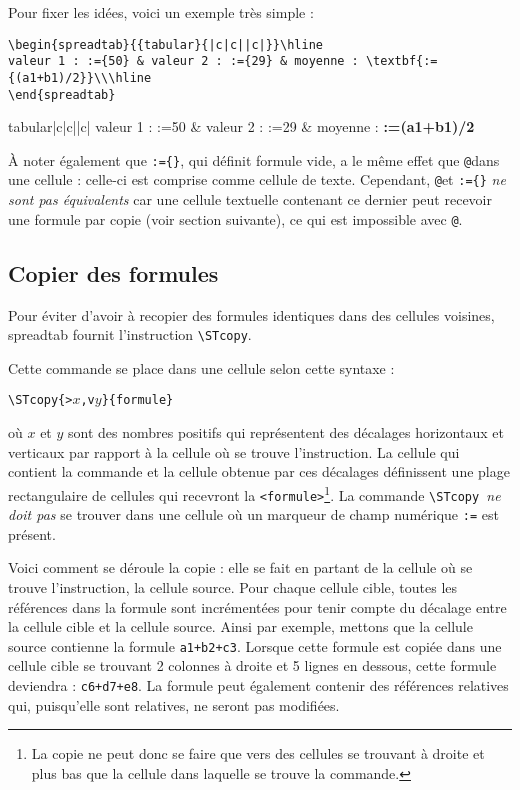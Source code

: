 \documentclass[a4paper,10pt]{article}
\newcommand\verbinline[1][]{\lstinline[breaklines=false,basicstyle=\normalsize\ttfamily,#1]}
\newcommand\ST{\textsf{spreadtab}\xspace}
\begin{document}
Pour fixer les idées, voici un exemple très simple :\par\nobreak
\begin{lstlisting}
\begin{spreadtab}{{tabular}{|c|c||c|}}\hline
valeur 1 : :={50} & valeur 2 : :={29} & moyenne : \textbf{:={(a1+b1)/2}}\\\hline
\end{spreadtab}
\end{lstlisting}
\begin{center}
\begin{spreadtab}{{tabular}{|c|c||c|}}\hline
valeur 1 : :={50} & valeur 2 : :={29} & moyenne : \textbf{:={(a1+b1)/2}}\\\hline
\end{spreadtab}
\end{center}
À noter également que \og\verb-:={}-\fg{}, qui définit formule vide, a le même effet que \og\verb-@-\fg dans une cellule : celle-ci est comprise comme cellule de texte. Cependant, \og\verb-@-\fg et \og\verb-:={}-\fg{} \emph{ne sont pas équivalents} car une cellule textuelle contenant ce dernier peut recevoir une formule par copie (voir section suivante), ce qui est impossible avec \og\verb-@-\fg.

\subsection{Copier des formules}
Pour éviter d'avoir à recopier des formules identiques dans des cellules voisines, \ST fournit l'instruction \verbinline-\STcopy-.

Cette commande se place dans une cellule selon cette syntaxe :
\begin{center}
\verbinline-\STcopy{>-$x$\verbinline-,v-$y$\verbinline-}{formule}-
\end{center}
où $x$ et $y$ sont des nombres positifs qui représentent des décalages horizontaux et verticaux par rapport à la cellule où se trouve l'instruction. La cellule qui contient la commande et la cellule obtenue par ces décalages définissent une plage rectangulaire de cellules qui recevront la \verb-<formule>-\footnote{La copie ne peut donc se faire que vers des cellules se trouvant à droite et plus bas que la cellule dans laquelle se trouve la commande.}. La commande \verbinline-\STcopy -\emph{ne doit pas} se trouver dans une cellule où un marqueur de champ numérique \og\verb-:=-\fg{} est présent.

Voici comment se déroule la copie : elle se fait en partant de la cellule où se trouve l'instruction, la cellule source. Pour chaque cellule cible, toutes les références dans la formule sont incrémentées pour tenir compte du décalage entre la cellule cible et la cellule source. Ainsi par exemple, mettons que la cellule source contienne la formule \verb-a1+b2+c3-. Lorsque cette formule est copiée dans une cellule cible se trouvant 2 colonnes à droite et 5 lignes en dessous, cette formule deviendra : \verb-c6+d7+e8-. La formule peut également contenir des références relatives qui, puisqu'elle sont relatives, ne seront pas modifiées.
\end{document}
